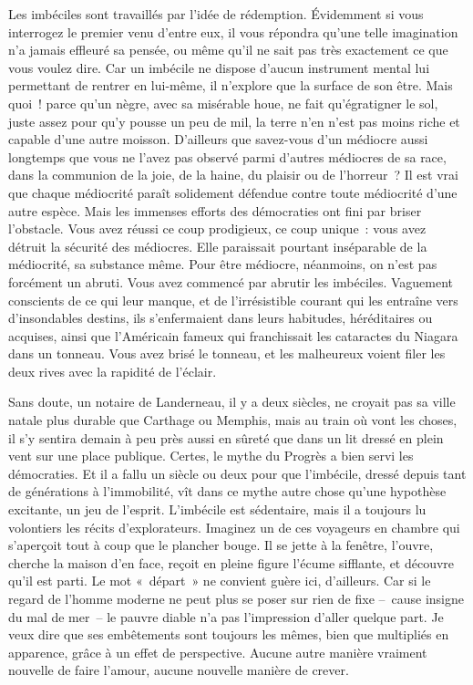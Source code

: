 \documentclass[french,twoside]{book} %
\begin{document}
\noindent Les imbéciles sont travaillés par l’idée de rédemption. Évidemment si vous interrogez le premier venu d’entre eux, il vous répondra qu’une telle imagination n’a jamais effleuré sa pensée, ou même qu’il ne sait pas très exactement ce que vous voulez dire. Car un imbécile ne dispose d’aucun instrument mental lui permettant de rentrer en lui-même, il n’explore que la surface de son être. Mais quoi ! parce qu’un nègre, avec sa misérable houe, ne fait qu’égratigner le sol, juste assez pour qu’y pousse un peu de mil, la terre n’en n’est pas moins riche et capable d’une autre moisson. D’ailleurs que savez-vous d’un médiocre aussi longtemps que vous ne l’avez pas observé parmi d’autres médiocres de sa race, dans la communion de la joie, de la haine, du plaisir ou de l’horreur ? Il est vrai que chaque médiocrité paraît solidement défendue contre toute médiocrité d’une autre espèce. Mais les immenses efforts des démocraties ont fini par briser l’obstacle. Vous avez réussi ce coup prodigieux, ce coup unique : vous avez détruit la sécurité des médiocres. Elle paraissait pourtant inséparable de la médiocrité, sa substance même. Pour être médiocre, néanmoins, on n’est pas forcément un abruti. Vous avez commencé par abrutir les imbéciles. Vaguement conscients de ce qui leur manque, et de l’irrésistible courant qui les entraîne vers d’insondables destins, ils s’enfermaient dans leurs habitudes, héréditaires ou acquises, ainsi que l’Américain fameux qui franchissait les cataractes du Niagara dans un tonneau. Vous avez brisé le tonneau, et les malheureux voient filer les deux rives avec la rapidité de l’éclair.\par
Sans doute, un notaire de Landerneau, il y a deux siècles, ne croyait pas sa ville natale plus durable que Carthage ou Memphis, mais au train où vont les choses, il s’y sentira demain à peu près aussi en sûreté que dans un lit dressé en plein vent sur une place publique. Certes, le mythe du Progrès a bien servi les démocraties. Et il a fallu un siècle ou deux pour que l’imbécile, dressé depuis tant de générations à l’immobilité, vît dans ce mythe autre chose qu’une hypothèse excitante, un jeu de l’esprit. L’imbécile est sédentaire, mais il a toujours lu volontiers les récits d’explorateurs. Imaginez un de ces voyageurs en chambre qui s’aperçoit tout à coup que le plancher bouge. Il se jette à la fenêtre, l’ouvre, cherche la maison d’en face, reçoit en pleine figure l’écume sifflante, et découvre qu’il est parti. Le mot « départ » ne convient guère ici, d’ailleurs. Car si le regard de l’homme moderne ne peut plus se poser sur rien de fixe – cause insigne du mal de mer – le pauvre diable n’a pas l’impression d’aller quelque part. Je veux dire que ses embêtements sont toujours les mêmes, bien que multipliés en apparence, grâce à un effet de perspective. Aucune autre manière vraiment nouvelle de faire l’amour, aucune nouvelle manière de crever.\par
\end{document}
